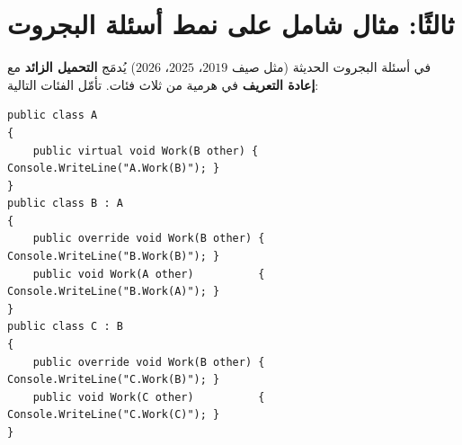\documentclass[14pt]{extarticle}
\begin{document}
\clearpage
\section*{ثالثًا: مثال شامل على نمط أسئلة البجروت}

في أسئلة البجروت الحديثة (مثل صيف $2019$، $2025$، $2026$) يُدمَج \textbf{التحميل الزائد} مع \textbf{إعادة التعريف} في هرمية من ثلاث فئات. تأمّل الفئات التالية:

\begin{boxCode}
\begin{english}
\begin{verbatim}
public class A
{
    public virtual void Work(B other) { Console.WriteLine("A.Work(B)"); }
}
public class B : A
{
    public override void Work(B other) { Console.WriteLine("B.Work(B)"); }
    public void Work(A other)          { Console.WriteLine("B.Work(A)"); }
}
public class C : B
{
    public override void Work(B other) { Console.WriteLine("C.Work(B)"); }
    public void Work(C other)          { Console.WriteLine("C.Work(C)"); }
}
\end{verbatim}
\end{english}
\end{boxCode}

\begin{center}
\begin{english}
\end{english}
\end{center}
\end{document}
